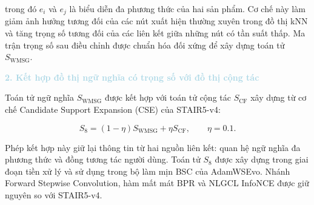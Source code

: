 trong đó $e_i$ và $e_j$ là biểu diễn đa phương thức của hai sản phẩm. Cơ chế này làm giảm ảnh hưởng tương đối của các nút xuất hiện thường xuyên trong đồ thị kNN và tăng trọng số tương đối của các liên kết giữa những nút có tần suất thấp. Ma trận trọng số sau điều chỉnh được chuẩn hóa đối xứng để xây dựng toán tử $S_{\mathrm{WMSG}}$.

\noindent\textcolor{lightblue}{\textbf{2. Kết hợp đồ thị ngữ nghĩa có trọng số với đồ thị cộng tác}}

Toán tử ngữ nghĩa $S_{\mathrm{WMSG}}$ được kết hợp với toán tử cộng tác $S_{\mathrm{CF}}$ xây dựng từ cơ chế Candidate Support Expansion (CSE) của STAIR5-v4:

\begin{equation}
S_8=(1-\eta)S_{\mathrm{WMSG}}+\eta S_{\mathrm{CF}},
\qquad \eta=0.1.
\end{equation}

Phép kết hợp này giữ lại thông tin từ hai nguồn liên kết: quan hệ ngữ nghĩa đa phương thức và đồng tương tác người dùng. Toán tử $S_8$ được xây dựng trong giai đoạn tiền xử lý và sử dụng trong bộ làm mịn BSC của AdamWSEvo. Nhánh Forward Stepwise Convolution, hàm mất mát BPR và NLGCL InfoNCE được giữ nguyên so với STAIR5-v4.


